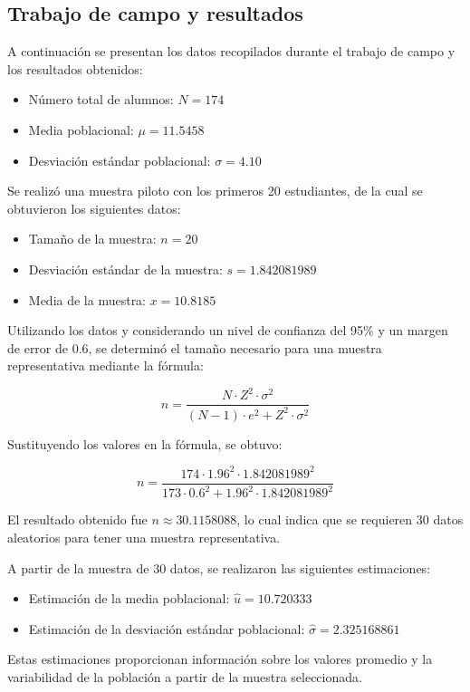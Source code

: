\documentclass[
  a4paper,
]{article}
\providecommand{\tightlist}{%
  \setlength{\itemsep}{0pt}\setlength{\parskip}{0pt}}\usepackage{longtable,booktabs,array}
\begin{document}
\hypertarget{trabajo-de-campo-y-resultados}{%
\subsection{Trabajo de campo y
resultados}\label{trabajo-de-campo-y-resultados}}

A continuación se presentan los datos recopilados durante el trabajo de
campo y los resultados obtenidos:

\begin{itemize}
\tightlist
\item
  Número total de alumnos: \(N = 174\)
\item
  Media poblacional: \(\mu = 11.5458\)
\item
  Desviación estándar poblacional: \(\sigma = 4.10\)
\end{itemize}

Se realizó una muestra piloto con los primeros 20 estudiantes, de la
cual se obtuvieron los siguientes datos:

\begin{itemize}
\tightlist
\item
  Tamaño de la muestra: \(n = 20\)
\item
  Desviación estándar de la muestra: \(s = 1.842081989\)
\item
  Media de la muestra: \(x = 10.8185\)
\end{itemize}

Utilizando los datos y considerando un nivel de confianza del 95\% y un
margen de error de 0.6, se determinó el tamaño necesario para una
muestra representativa mediante la fórmula:

\[
n = \frac{{N \cdot Z^2 \cdot \sigma^2}}{{(N-1) \cdot e^2 + Z^2 \cdot \sigma^2}}
\]

Sustituyendo los valores en la fórmula, se obtuvo:

\[
n = \frac{{174 \cdot 1.96^2 \cdot 1.842081989^2}}{{173 \cdot 0.6^2 + 1.96^2 \cdot 1.842081989^2}}
\]

El resultado obtenido fue \(n \approx 30.1158088\), lo cual indica que
se requieren 30 datos aleatorios para tener una muestra representativa.

A partir de la muestra de 30 datos, se realizaron las siguientes
estimaciones:

\begin{itemize}
\tightlist
\item
  Estimación de la media poblacional: \(\hat{u} = 10.720333\)
\item
  Estimación de la desviación estándar poblacional:
  \(\hat{\sigma} = 2.325168861\)
\end{itemize}

Estas estimaciones proporcionan información sobre los valores promedio y
la variabilidad de la población a partir de la muestra seleccionada.


\printbibliography
\end{document}
